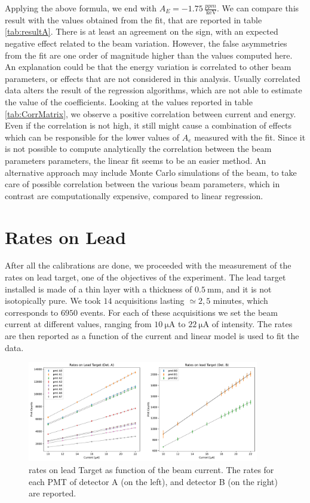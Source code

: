 Applying the above formula, we end with $A_{E} = -1.75 \, \frac{ppm}{\SI{}{\kilo \electronvolt}}$. We can compare this result with the values obtained from the fit, that are reported in table \ref{tab:resultA}. There is at least an agreement on the sign, with an expected negative effect related to the beam variation. However, the false asymmetries from the fit are one order of magnitude higher than the values computed here. An explanation could be that the energy variation is correlated to other beam parameters, or effects that are not considered in this analysis. Usually correlated data alters the result of the regression algorithms, which are not able to estimate the value of the coefficients. Looking at the values reported in table \ref{tab:CorrMatrix}, we observe a positive correlation between current and energy. Even if the correlation is not high, it still might cause a combination of effects which can be responsible for the lower values of $A_{e}$ measured with the fit.
Since it is not possible to compute analytically the correlation between the beam parameters parameters, the linear fit seems to be an easier method. An alternative approach may include Monte Carlo simulations of the beam, to take care of possible correlation between the various beam parameters, which in contrast are computationally expensive, compared to linear regression.

\section{Rates on Lead}

After all the calibrations are done, we proceeded with the measurement of the rates on lead target, one of the objectives of the experiment.
The lead target installed is made of a thin layer with a thickness of $\SI{0.5}{\milli \meter}$, and it is not isotopically pure.
We took $14$ acquisitions lasting $\simeq 2,5$ minutes, which corresponds to $6950$ events. For each of these acquisitions we set the beam current at different values, ranging from $\SI{10}{\micro \ampere}$ to $\SI{22}{\micro \ampere}$ of intensity. The rates are then reported as a function of the current and linear model is used to fit the data.

\begin{figure}[hbtp]
\centering
\includegraphics[width = 0.9\textwidth]{Analysis/LeadRates/LeadRates.pdf}
\caption{rates on lead Target as function of the beam current. The rates for each PMT of detector A (on the left), and detector B (on the right) are reported.}
\end{figure}

